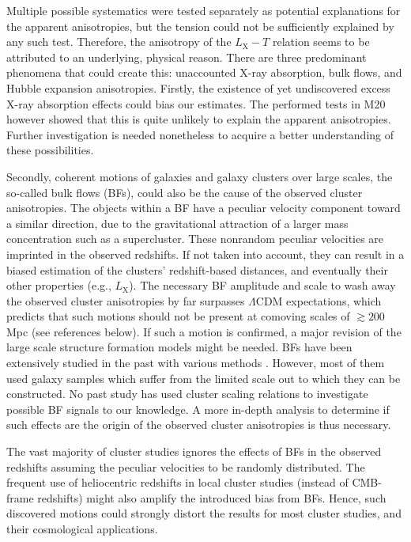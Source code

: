 \documentclass{aa}   %
\begin{document}
Multiple possible systematics were tested separately as potential explanations for the apparent anisotropies, but the tension could not be sufficiently explained by any such test. Therefore, the anisotropy of the $L_{\text{X}}-T$ relation seems to be attributed to an underlying, physical reason. There are three predominant phenomena that could create this: unaccounted X-ray absorption, bulk flows, and Hubble expansion anisotropies. Firstly, the existence of yet undiscovered excess X-ray absorption effects could bias our estimates. The performed tests in M20 however showed that this is quite unlikely to explain the apparent anisotropies. Further investigation is needed nonetheless to acquire a better understanding of these possibilities.

Secondly, coherent motions of galaxies and galaxy clusters over large scales, the so-called bulk flows (BFs), could also be the cause of the observed cluster anisotropies. The objects within a BF have a peculiar velocity component toward a similar direction, due to the gravitational attraction of a larger mass concentration such as a supercluster. These nonrandom peculiar velocities are imprinted in the observed redshifts. If not taken into account, they can result in a biased estimation of the clusters' redshift-based distances, and eventually their other properties (e.g., $L_{\text{X}}$). The necessary BF amplitude and scale to wash away the observed cluster anisotropies by far surpasses $\Lambda$CDM expectations, which predicts that such motions should not be present at comoving scales of $\gtrsim 200$ Mpc (see references below). If such a motion is confirmed, a major revision of the large scale structure formation models might be needed. BFs have been extensively studied in the past with various methods \citep[e.g.,][]{lauer,hudson04,kashl08,kashl10,colin2011,osborne,feindt,appleby-john,carrick,hoffman,scrimgeour,watkins2,peery,qin}. However, most of them used galaxy samples which suffer from the limited scale out to which they can be constructed. No past study has used cluster scaling relations to investigate possible BF signals to our knowledge. A more in-depth analysis to determine if such effects are the origin of the observed cluster anisotropies is thus necessary. 

The vast majority of cluster studies ignores the effects of BFs in the observed redshifts assuming the peculiar velocities to be randomly distributed. The frequent use of heliocentric redshifts in local cluster studies (instead of CMB-frame redshifts) might also amplify the introduced bias from BFs. Hence, such discovered motions could strongly distort the results for most cluster studies, and their cosmological applications. 
\end{document}

